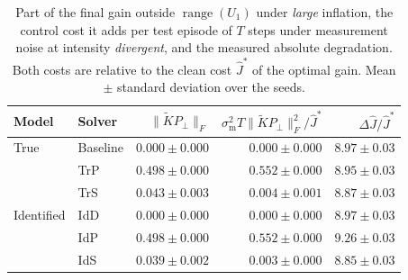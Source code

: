 \begin{table}[htbp]
\centering
\caption{Part of the final gain outside $\operatorname{range}(U_1)$ under \emph{large} inflation, the control cost it adds per test episode of $T$ steps under measurement noise at intensity \emph{divergent}, and the measured absolute degradation. Both costs are relative to the clean cost $\hat{J}^{*}$ of the optimal gain. Mean $\pm$ standard deviation over the seeds.}
\label{tab:app-frozen-gain}
\begin{tabular}{@{}llrrr@{}}
\toprule
Model & Solver & $\lVert \tilde{K} P_{\perp} \rVert_F$ & $\sigma_{\mathrm{m}}^{2} T \lVert \tilde{K} P_{\perp} \rVert_F^2 / \hat{J}^{*}$ & $\Delta \hat{J} / \hat{J}^{*}$ \\
\midrule
True & Baseline & $0.000 \pm 0.000$ & $0.000 \pm 0.000$ & $8.97 \pm 0.03$ \\
 & TrP & $0.498 \pm 0.000$ & $0.552 \pm 0.000$ & $8.95 \pm 0.03$ \\
 & TrS & $0.043 \pm 0.003$ & $0.004 \pm 0.001$ & $8.87 \pm 0.03$ \\
\midrule
Identified & IdD & $0.000 \pm 0.000$ & $0.000 \pm 0.000$ & $8.97 \pm 0.03$ \\
 & IdP & $0.498 \pm 0.000$ & $0.552 \pm 0.000$ & $9.26 \pm 0.03$ \\
 & IdS & $0.039 \pm 0.002$ & $0.003 \pm 0.000$ & $8.85 \pm 0.03$ \\
\bottomrule
\end{tabular}
\end{table}
